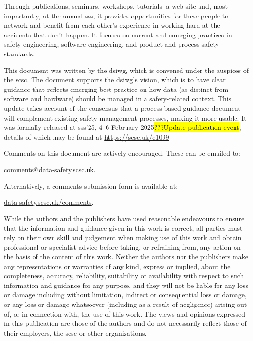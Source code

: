Through publications, seminars, workshops, tutorials, a web site and, most importantly, at the annual \gls{sss}, it provides opportunities for these people to network and benefit from each other’s experience in working hard at the accidents that don’t happen. It focuses on current and emerging practices in safety engineering, software engineering, and product and process safety standards.

This document was written by the \gls{dsiwg}, which is convened under the auspices of the \gls{scsc}. The document supports the \gls{dsiwg}'s vision, which is to have clear guidance that reflects emerging best practice on how data (as distinct from software and hardware) should be managed in a safety-related context. This update takes account of the consensus that a process-based guidance document will complement existing safety management processes, making it more usable. It was formally released at
\gls{sss}'25, 4--6 February 2025\hl{???Update publication event},
details of which may be found at
\href{https://scsc.uk/e1099}{https://scsc.uk/e1099}%

Comments on this document are actively encouraged. These can be emailed to: 
\begin{center}
	\href{mailto:comments@data-safety.scsc.uk}{comments@data-safety.scsc.uk}.
\end{center}

Alternatively, a comments submission form is available at:
\begin{center}
	\href{http://scsc.uk/data-comments.html}{data-safety.scsc.uk/comments}.
\end{center}

While the authors and the publishers have used reasonable endeavours to ensure that the information and guidance given in this work is correct, all parties must rely on their own skill and judgement when making use of this work and obtain professional or specialist advice before taking, or refraining from, any action on the basis of the content of this work. Neither the authors nor the publishers make any representations or warranties of any kind, express or implied, about the completeness, accuracy, reliability, suitability or availability with respect to such information and guidance for any purpose, and they will not be liable for any loss or damage including without limitation, indirect or consequential loss or damage, or any loss or damage whatsoever (including as a result of negligence) arising out of, or in connection with, the use of this work. The views and opinions expressed in this publication are those of the authors and do not necessarily reflect those of their employers, the \gls{scsc} or other organizations.

